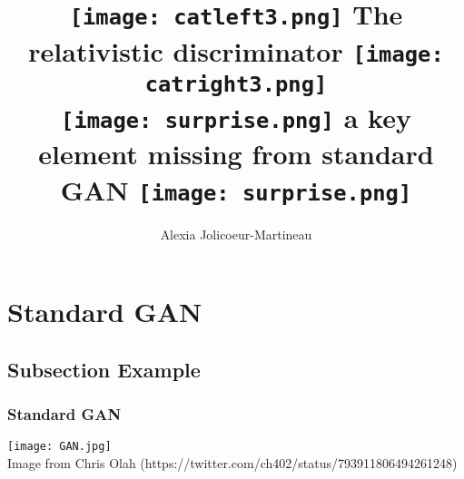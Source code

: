 \documentclass[t]{beamer}
\title[Relativistic GANs]{\texttt{[image: catleft3.png]} The relativistic discriminator \texttt{[image: catright3.png]} \\ \texttt{[image: surprise.png]}  a key element missing from  standard GAN \texttt{[image: surprise.png]}} %
\author{Alexia Jolicoeur-Martineau} %
\institute[] %
{
\textit{alexia.jolicoeur-martineau@mail.mcgill.ca} %
}
\begin{document}
\begin{frame}
\titlepage %
\end{frame}



\section{Standard GAN} %

\subsection{Subsection Example} %

\begin{frame}
\frametitle{Standard GAN}
\texttt{[image: GAN.jpg]}\\
{\tiny Image from Chris Olah (https://twitter.com/ch402/status/793911806494261248)}
\end{frame}

\end{document}

